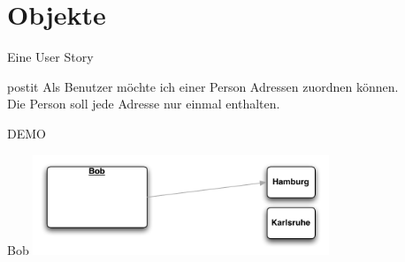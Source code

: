 \part{Objekte}

\begin{frame}{Eine User Story}
\hbox{}\hfill\begin{beamercolorbox}[sep=1em,wd=7cm,shadow=true,rounded=true]{postit} 
Als Benutzer möchte ich einer Person Adressen zuordnen können.\\[1em]
Die Person soll jede Adresse nur einmal enthalten.
\end{beamercolorbox}\hfill\hbox{}
\end{frame}

\begin{frame}{}
\begin{center}
DEMO
\end{center}
\end{frame}



\begin{frame}[t]{Bob}
\includegraphics[height=3cm]{Bob1.pdf}

\end{frame}


